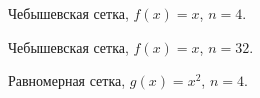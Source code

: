 \documentclass[12pt, a4paper]{article}
\begin{document}
\pagebreak


\begin{figure}[h]
    \caption{Чебышевская сетка, $f(x) = x$, $n = 4$.}
\end{figure}

\begin{figure}[h]
    \caption{Чебышевская сетка, $f(x) = x$, $n = 32$.}
\end{figure}

\pagebreak


\begin{figure}[h]
    \caption{Равномерная сетка, $g(x) = x^2$, $n = 4$.}
\end{figure}
\end{document}
